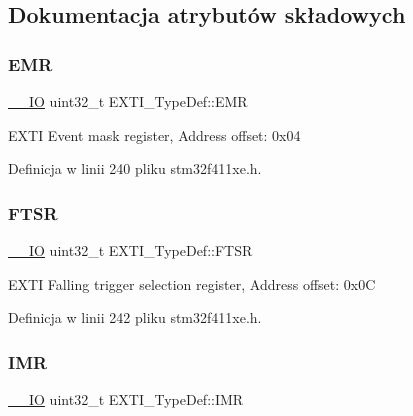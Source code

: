 \subsection{Dokumentacja atrybutów składowych}
\mbox{\label{struct_e_x_t_i___type_def_a9c5bff67bf9499933959df7eb91a1bd6}} 
\subsubsection{\texorpdfstring{E\+MR}{EMR}}
{\footnotesize\ttfamily \hyperlink{core__sc300_8h_aec43007d9998a0a0e01faede4133d6be}{\+\_\+\+\_\+\+IO} uint32\+\_\+t E\+X\+T\+I\+\_\+\+Type\+Def\+::\+E\+MR}

E\+X\+TI Event mask register, Address offset\+: 0x04 

Definicja w linii 240 pliku stm32f411xe.\+h.

\mbox{\label{struct_e_x_t_i___type_def_aee667dc148250bbf37fdc66dc4a9874d}} 
\subsubsection{\texorpdfstring{F\+T\+SR}{FTSR}}
{\footnotesize\ttfamily \hyperlink{core__sc300_8h_aec43007d9998a0a0e01faede4133d6be}{\+\_\+\+\_\+\+IO} uint32\+\_\+t E\+X\+T\+I\+\_\+\+Type\+Def\+::\+F\+T\+SR}

E\+X\+TI Falling trigger selection register, Address offset\+: 0x0C 

Definicja w linii 242 pliku stm32f411xe.\+h.

\mbox{\label{struct_e_x_t_i___type_def_a17d061db586d4a5aa646b68495a8e6a4}} 
\subsubsection{\texorpdfstring{I\+MR}{IMR}}
{\footnotesize\ttfamily \hyperlink{core__sc300_8h_aec43007d9998a0a0e01faede4133d6be}{\+\_\+\+\_\+\+IO} uint32\+\_\+t E\+X\+T\+I\+\_\+\+Type\+Def\+::\+I\+MR}

